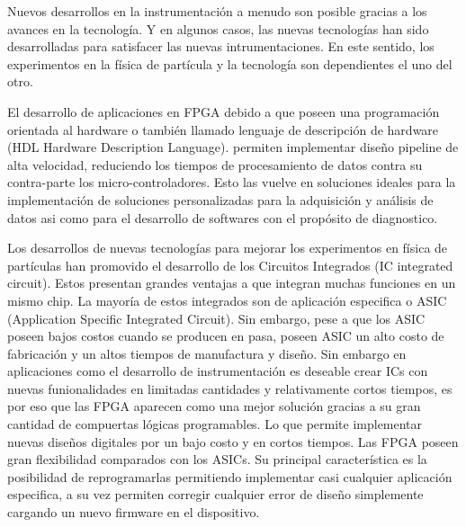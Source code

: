 Nuevos desarrollos en la instrumentación a menudo son posible gracias a los avances en la tecnología. Y en algunos casos, las nuevas tecnologías han sido desarrolladas para satisfacer las nuevas intrumentaciones. En este sentido, los experimentos en la física de partícula y la tecnología son dependientes el uno del otro.

El desarrollo de aplicaciones en FPGA debido a que poseen una programación orientada al hardware o también llamado lenguaje de descripción de hardware (HDL Hardware Description Language). permiten implementar diseño pipeline de alta velocidad, reduciendo los tiempos de procesamiento de datos contra su contra-parte los micro-controladores. Esto las vuelve en soluciones ideales para la implementación  de soluciones personalizadas para la adquisición y  análisis  de datos asi como para el desarrollo de softwares con el propósito de diagnostico.
 
 
 Los desarrollos de nuevas tecnologías para mejorar los experimentos en física de partículas han promovido el desarrollo de los Circuitos Integrados (IC integrated circuit). Estos presentan grandes ventajas a que integran muchas funciones en un mismo chip. La mayoría de estos integrados son de aplicación especifica o ASIC (Application Specific Integrated Circuit). Sin embargo, pese a que los ASIC poseen bajos costos cuando se producen en pasa, poseen  ASIC un alto costo de fabricación  y un altos tiempos de manufactura y diseño. 
Sin embargo en aplicaciones como el desarrollo de instrumentación es deseable crear ICs con nuevas funionalidades en limitadas cantidades y relativamente cortos tiempos, es por eso que las FPGA aparecen como una mejor solución gracias a su gran cantidad de compuertas lógicas programables. Lo que permite implementar nuevas diseños digitales por un bajo costo y en cortos tiempos. 
Las FPGA poseen gran flexibilidad comparados con los ASICs. Su principal característica es la posibilidad de reprogramarlas permitiendo implementar casi cualquier aplicación especifica, a su vez permiten corregir cualquier error de diseño simplemente cargando un nuevo firmware en el dispositivo.




